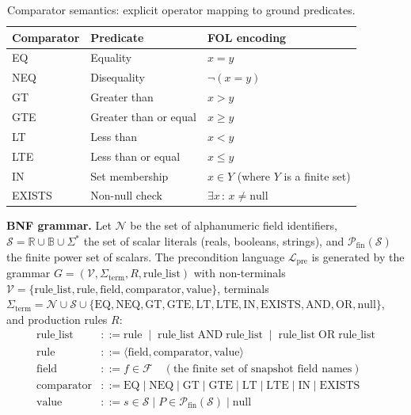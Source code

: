 \begin{table}[htbp]
\centering
\small
\caption{Comparator semantics: explicit operator mapping to ground predicates.}
\label{tab:comparator-semantics}
\begin{tabular}{@{}p{2.5cm}p{3cm}p{5.5cm}@{}}
\toprule
\textbf{Comparator} & \textbf{Predicate} & \textbf{FOL encoding} \\
\midrule
EQ & Equality & $x = y$ \\
NEQ & Disequality & $\neg(x = y)$ \\
GT & Greater than & $x > y$ \\
GTE & Greater than or equal & $x \geq y$ \\
LT & Less than & $x < y$ \\
LTE & Less than or equal & $x \leq y$ \\
IN & Set membership & $x \in Y$ (where $Y$ is a finite set) \\
EXISTS & Non-null check & $\exists x \,:\, x \neq \text{null}$ \\
\bottomrule
\end{tabular}
\end{table}

\textbf{BNF grammar.} Let $\mathcal{N}$ be the set of alphanumeric field identifiers, $\mathcal{S} = \mathbb{R} \cup \mathbb{B} \cup \Sigma^*$ the set of scalar literals (reals, booleans, strings), and $\mathcal{P}_{\text{fin}}(\mathcal{S})$ the finite power set of scalars. The precondition language $\mathcal{L}_{\text{pre}}$ is generated by the grammar $G = (\mathcal{V}, \Sigma_{\text{term}}, R, \text{rule\_list})$ with non-terminals $\mathcal{V} = \{\text{rule\_list}, \text{rule}, \text{field}, \text{comparator}, \text{value}\}$, terminals $\Sigma_{\text{term}} = \mathcal{N} \cup \mathcal{S} \cup \{\text{EQ}, \text{NEQ}, \text{GT}, \text{GTE}, \text{LT}, \text{LTE}, \text{IN}, \text{EXISTS}, \text{AND}, \text{OR}, \text{null}\}$, and production rules $R$:
{\small
\begin{align*}
    \text{rule\_list} &::= \text{rule} \;\mid\; \text{rule\_list} \; \text{AND} \; \text{rule\_list} \;\mid\; \text{rule\_list} \; \text{OR} \; \text{rule\_list} \\
    \text{rule} &::= \langle \text{field}, \text{comparator}, \text{value} \rangle \\
    \text{field} &::= f \in \mathcal{F} \quad (\text{the finite set of snapshot field names}) \\
    \text{comparator} &::= \text{EQ} \mid \text{NEQ} \mid \text{GT} \mid \text{GTE} \mid \text{LT} \mid \text{LTE} \mid \text{IN} \mid \text{EXISTS} \\
    \text{value} &::= s \in \mathcal{S} \mid P \in \mathcal{P}_{\text{fin}}(\mathcal{S}) \mid \text{null}
\end{align*}
}

